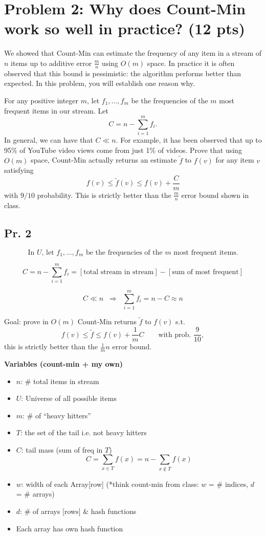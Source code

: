\documentclass[11pt]{article}
\begin{document}
\section*{Problem 2: Why does Count-Min work so well in practice? (12 pts)}
We showed that Count-Min can estimate the frequency of any item in a stream of $n$ items up to additive error $\tfrac{m}{n}$ using $O(m)$ space. In practice it is often observed that this bound is pessimistic: the algorithm performs better than expected. In this problem, you will establish one reason why.

For any positive integer $m$, let $f_1,\dots,f_m$ be the frequencies of the $m$ most frequent items in our stream. Let
\[ C = n - \sum_{i=1}^m f_i. \]
In general, we can have that $C\ll n$. For example, it has been observed that up to 95\% of YouTube video views come from just 1\% of videos. Prove that using $O(m)$ space, Count-Min actually returns an estimate $\tilde f$ to $f(v)$ for any item $v$ satisfying
\[ f(v) \le \tilde f(v) \le f(v) + \frac{C}{m} \]
with $9/10$ probability. This is strictly better than the $\tfrac{m}{n}$ error bound shown in class.

\subsection*{Pr. 2}

\[
\text{In $U$, let } f_1,\ldots,f_m \text{ be the frequencies of the $m$ most frequent items.}
\]

\[
C = n - \sum_{i=1}^{m} f_i
= [\text{total stream in stream}] - [\text{sum of most frequent}]
\]

\[
C \ll n \;\;\Rightarrow\;\; \sum_{i=1}^{m} f_i = n - C \approx n
\]

Goal: prove in $O(m)$ Count-Min returns $\tilde f$ to $f(v)$ s.t.
\[
f(v) \le \tilde f \le f(v) + \frac{1}{m}C
\qquad \text{with prob. } \frac{9}{10},
\]
this is strictly better than the $\frac{1}{m}n$ error bound.

\bigskip

\textbf{Variables (count-min + my own)}
\begin{itemize}
	\item $n$: \# total items in stream
	\item $U$: Universe of all possible items
	\item $m$: \# of ``heavy hitters''
	\item $T$: the set of the tail i.e. not heavy hitters
	\item $C$: tail mass (sum of freq in $T$)
	\[ C=\sum_{x\in T} f(x) = n - \sum_{x\notin T} f(x) \]
	\item $w$: width of each Array[row] \quad (*think count-min from class: $w$ = \# indices, $d$ = \# arrays)
	\item $d$: \# of arrays [rows] \& hash functions
	\item[*] Each array has own hash function
\end{itemize}
\end{document}
